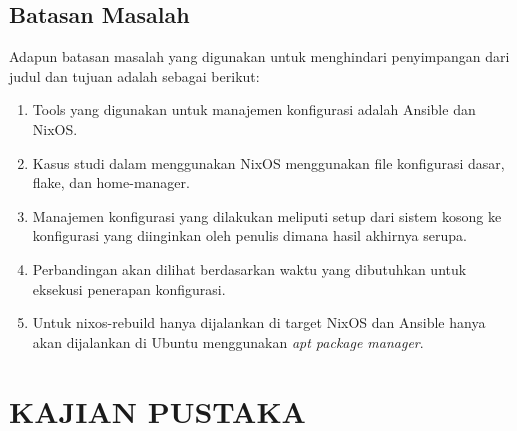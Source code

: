 \documentclass[10pt,twoside]{report}
\begin{document}
\section{Batasan Masalah}
\vspace{-3mm}
\begin{adjustwidth}{0.70cm}{}
	Adapun batasan masalah yang digunakan untuk menghindari penyimpangan dari judul dan tujuan adalah sebagai berikut:
	\begin{enumerate}[leftmargin=0.45cm]
		\item Tools yang digunakan untuk manajemen konfigurasi adalah Ansible dan
		      NixOS.
		\item Kasus studi dalam menggunakan NixOS menggunakan file konfigurasi
		      dasar, flake, dan home-manager.
		\item Manajemen konfigurasi yang dilakukan meliputi setup dari sistem
		      kosong ke konfigurasi yang diinginkan oleh penulis dimana hasil akhirnya
		      serupa.
		\item Perbandingan akan dilihat berdasarkan waktu yang dibutuhkan untuk
		      eksekusi penerapan konfigurasi.
		\item Untuk nixos-rebuild hanya dijalankan di target NixOS dan Ansible hanya
		      akan dijalankan di Ubuntu menggunakan \textit{apt package manager}.
	\end{enumerate}
\end{adjustwidth}
\chapter{KAJIAN PUSTAKA}
\end{document}
